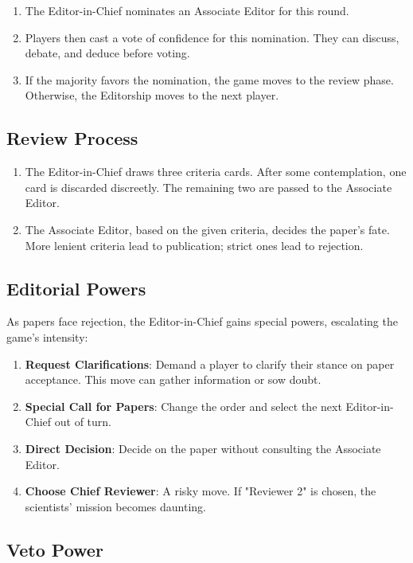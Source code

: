 \documentclass[sigplan,screen,nonacm]{acmart}
\begin{document}
\begin{enumerate}
	\item The Editor-in-Chief nominates an Associate Editor for this round.
	\item Players then cast a vote of confidence for this nomination. They can discuss, debate, and deduce before voting.
	\item If the majority favors the nomination, the game moves to the review phase. Otherwise, the Editorship moves to the next player.
\end{enumerate}

\subsection{Review Process}

\begin{enumerate}
	\item The Editor-in-Chief draws three criteria cards. After some contemplation, one card is discarded discreetly. The remaining two are passed to the Associate Editor.
	\item The Associate Editor, based on the given criteria, decides the paper's fate. More lenient criteria lead to publication; strict ones lead to rejection.
\end{enumerate}

\subsection{Editorial Powers}

As papers face rejection, the Editor-in-Chief gains special powers, escalating the game's intensity:

\begin{enumerate}
	\item \textbf{Request Clarifications}: Demand a player to clarify their stance on paper acceptance. This move can gather information or sow doubt.
	\item \textbf{Special Call for Papers}: Change the order and select the next Editor-in-Chief out of turn.
	\item \textbf{Direct Decision}: Decide on the paper without consulting the Associate Editor.
	\item \textbf{Choose Chief Reviewer}: A risky move. If "Reviewer 2" is chosen, the scientists' mission becomes daunting.
\end{enumerate}

\subsection{Veto Power}
\end{document}

